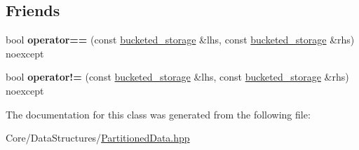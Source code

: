 \subsection*{Friends}
\begin{DoxyCompactItemize}
\item 
\mbox{\label{classsequoia_1_1data__structures_1_1bucketed__storage_a3891515691aad3068910b9f5d32406e3}} 
bool {\bfseries operator==} (const \mbox{\hyperlink{classsequoia_1_1data__structures_1_1bucketed__storage}{bucketed\+\_\+storage}} \&lhs, const \mbox{\hyperlink{classsequoia_1_1data__structures_1_1bucketed__storage}{bucketed\+\_\+storage}} \&rhs) noexcept
\item 
\mbox{\label{classsequoia_1_1data__structures_1_1bucketed__storage_ad3d01e83dd281043df95bb72fb5f5d88}} 
bool {\bfseries operator!=} (const \mbox{\hyperlink{classsequoia_1_1data__structures_1_1bucketed__storage}{bucketed\+\_\+storage}} \&lhs, const \mbox{\hyperlink{classsequoia_1_1data__structures_1_1bucketed__storage}{bucketed\+\_\+storage}} \&rhs) noexcept
\end{DoxyCompactItemize}


The documentation for this class was generated from the following file\+:\begin{DoxyCompactItemize}
\item 
Core/\+Data\+Structures/\mbox{\hyperlink{_partitioned_data_8hpp}{Partitioned\+Data.\+hpp}}\end{DoxyCompactItemize}
